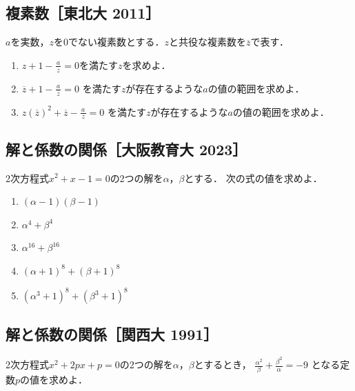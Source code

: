 \documentclass[../../ms_q.tex]{subfiles}
\begin{document}
\subsection{複素数［東北大 2011］}

$a$を実数，$z$を0でない複素数とする．$z$と共役な複素数を$\overline{z}$で表す．

\begin{enumerate}

    \item $\displaystyle z+1-\frac{a}{\,z\,} = 0$を満たす$z$を求めよ．

    \item $\displaystyle \overline{z}+1-\frac{a}{\,\overline{z}\,} = 0$
        を満たす$z$が存在するような$a$の値の範囲を求めよ．

    \item $\displaystyle z(\overline{z})^2 + \overline{z} - \frac{a}{\,z\,} = 0$
        を満たす$z$が存在するような$a$の値の範囲を求めよ．

\end{enumerate}

\vspace{2cm}
\vfill

\subsection{解と係数の関係［大阪教育大 2023］}

2次方程式$x^2+x-1=0$の2つの解を$\alpha$，$\beta$とする．
次の式の値を求めよ．

\begin{enumerate}
    \item $(\alpha-1)(\beta-1)$
    \item $\alpha^4+\beta^4$
    \item $\alpha^{16}+\beta^{16}$
    \item $(\alpha+1)^8+(\beta+1)^8$
    \item $(\alpha^3+1)^8+(\beta^3+1)^8$
\end{enumerate}

\vspace{2cm}
\vfill

\subsection{解と係数の関係［関西大 1991］}

2次方程式$x^2+2px+p=0$の2つの解を$\alpha$，$\beta$とするとき，
$\displaystyle \frac{\alpha^2}{\beta}+ \frac{\beta^2}{\alpha}=-9$
となる定数$p$の値を求めよ．
\end{document}
